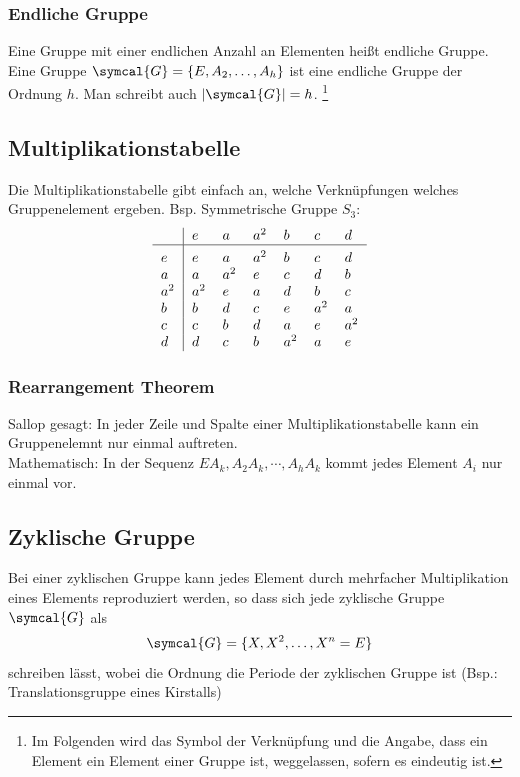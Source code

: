 \documentclass[
  captions=tableheading,  %
  titlepage=firstiscover, %
]{scrartcl}
\begin{document}
\subsubsection{Endliche Gruppe}
Eine Gruppe mit einer endlichen Anzahl an Elementen heißt endliche Gruppe.
Eine Gruppe $\symcal{G} = \{ E, A_2, \ldots, A_h \} $ ist eine endliche Gruppe der Ordnung $h$.
Man schreibt auch $|\symcal{G}| = h$.
\footnote{Im Folgenden wird das Symbol der Verknüpfung und die Angabe, dass ein Element ein Element
einer Gruppe ist, weggelassen, sofern es eindeutig ist.}
\subsection{Multiplikationstabelle}
Die Multiplikationstabelle gibt einfach an, welche Verknüpfungen welches Gruppenelement ergeben.
Bsp. Symmetrische Gruppe $S_3$:
\[
    \begin{tabular}{>{$}l<{$}|*{6}{>{$}l<{$}}}
    ~   & e   & a   & a^2 & b   & c   & d   \\
    \hline\vrule height 12pt width 0pt
    e   & e   & a   & a^2 & b   & c   & d   \\
    a   & a   & a^2 & e   & c   & d   & b   \\
    a^2 & a^2 & e   & a   & d   & b   & c   \\
    b   & b   & d   & c   & e   & a^2 & a   \\
    c   & c   & b   & d   & a   & e   & a^2 \\
    d   & d   & c   & b   & a^2 & a   & e   \\
    \end{tabular} 
\]
\subsubsection{Rearrangement Theorem}
Sallop gesagt: In jeder Zeile und Spalte einer Multiplikationstabelle kann ein Gruppenelemnt nur einmal auftreten.\\
Mathematisch: In der Sequenz $EA_k, A_2A_k, \cdots , A_h A_k$ kommt jedes Element $A_i$ nur einmal vor.
\subsection{Zyklische Gruppe}
Bei einer zyklischen Gruppe kann jedes Element durch mehrfacher Multiplikation eines Elements reproduziert werden, so dass
sich jede zyklische Gruppe $\symcal{G}$ als 
\begin{equation*}
  \symcal{G} = \{ X, X^2, \ldots, X^n = E \}
\end{equation*}
schreiben lässt, wobei die Ordnung die Periode der zyklischen Gruppe ist (Bsp.: Translationsgruppe eines Kirstalls)
\end{document}
